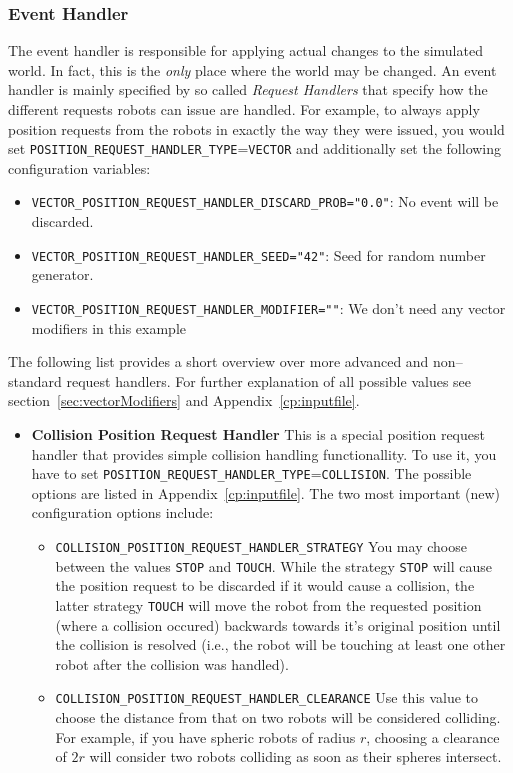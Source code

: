 \subsubsection{Event Handler}\label{sec:eventHandlers}

The event handler is responsible for applying actual changes to the simulated world. In fact, this is the \emph{only} place where the world may be changed. An event handler is mainly specified by so called \emph{Request Handlers} that specify how the different requests robots can issue are handled. For example, to always apply position requests from the robots in exactly the way they were issued, you would set \texttt{POSITION\_REQUEST\_HANDLER\_TYPE}=\texttt{VECTOR} and additionally set the following configuration variables:
\begin{itemize}
	\item \texttt{VECTOR\_POSITION\_REQUEST\_HANDLER\_DISCARD\_PROB="0.0"}: No event will be discarded.
	\item \texttt{VECTOR\_POSITION\_REQUEST\_HANDLER\_SEED="42"}: Seed for random number generator.
	\item \texttt{VECTOR\_POSITION\_REQUEST\_HANDLER\_MODIFIER=""}: We don't need any vector modifiers in this example
\end{itemize}

The following list provides a short overview over more advanced and non--standard request handlers. For further explanation of all possible values see section~\ref{sec:vectorModifiers} and Appendix~\ref{cp:inputfile}.

\begin{itemize}
\item \textbf{Collision Position Request Handler}
	This is a special position request handler that provides simple collision handling functionallity. To use it, you have to set \texttt{POSITION\_REQUEST\_HANDLER\_TYPE}=\texttt{COLLISION}. The possible options are listed in Appendix~\ref{cp:inputfile}. The two most important (new) configuration options include:
	\begin{itemize}
		\item \texttt{COLLISION\_POSITION\_REQUEST\_HANDLER\_STRATEGY} You may choose between the values \texttt{STOP} and \texttt{TOUCH}. While the strategy \texttt{STOP} will cause the position request to be discarded if it would cause a collision, the latter strategy \texttt{TOUCH} will move the robot from the requested position (where a collision occured) backwards towards it's original position until the collision is resolved (i.e., the robot will be touching at least one other robot after the collision was handled).
		\item \texttt{COLLISION\_POSITION\_REQUEST\_HANDLER\_CLEARANCE} Use this value to choose the distance from that on two robots will be considered colliding. For example, if you have spheric robots of radius $r$, choosing a clearance of $2r$ will consider two robots colliding as soon as their spheres intersect.
	\end{itemize}
\end{itemize}



